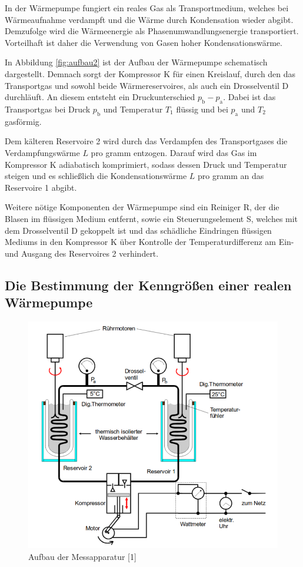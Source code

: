 In der Wärmepumpe fungiert ein reales Gas als Transportmedium, welches 
bei Wärmeaufnahme verdampft und die Wärme durch Kondensation wieder abgibt.
Demzufolge wird die Wärmeenergie als Phasenumwandlungsenergie transportiert.
Vorteilhaft ist daher die Verwendung von Gasen hoher Kondensationswärme. 

In Abbildung \ref{fig:aufbau2} ist der Aufbau der Wärmepumpe schematisch 
dargestellt. Demnach sorgt der Kompressor K für einen Kreislauf, durch 
den das Transportgas und sowohl beide Wärmereservoires, als auch ein 
Drosselventil D durchläuft. An diesem entsteht ein Druckunterschied 
$p_\text{b} - p_\text{a}$. Dabei ist das Transportgas bei Druck $p_\text{b}$ 
und Temperatur $T_1$ flüssig und bei $p_\text{a}$ und $T_2$ gasförmig.

Dem kälteren Reservoire 2 wird durch das Verdampfen des Transportgases 
die Verdampfungswärme $L$ pro gramm entzogen. Darauf wird das Gas im 
Kompressor K adiabatisch komprimiert, sodass dessen Druck und Temperatur steigen
und es schließlich die Kondensationswärme $L$ pro gramm an das Reservoire 1 abgibt.

Weitere nötige Komponenten der Wärmepumpe sind ein Reiniger R, der die Blasen 
im flüssigen Medium entfernt, sowie ein Steuerungselement S, welches mit dem 
Drosselventil D gekoppelt ist und das schädliche Eindringen flüssigen 
Mediums in den Kompressor K über Kontrolle der Temperaturdifferenz am Ein- 
und Ausgang des Reservoires 2 verhindert.

\subsection{Die Bestimmung der Kenngrößen einer realen Wärmepumpe}

\begin{figure}
    \centering
    \includegraphics[scale=0.7]{aufbau.pdf}
    \caption{Aufbau der Messapparatur [1]}
    \label{fig:aufbau}
\end{figure}

